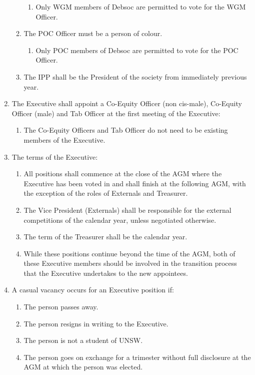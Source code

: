 \begin{enumerate}
\begin{enumerate}
    \begin{enumerate}
    \item Only WGM members of Debsoc are permitted to vote for the WGM Officer.
    \end{enumerate}
  \item The POC Officer must be a person of colour.
    \begin{enumerate}
    \item Only POC members of Debsoc are permitted to vote for the POC Officer.
    \end{enumerate}
  \item The IPP shall be the President of the society from immediately previous year. \label{ipp_desc}
  \end{enumerate}
\item The Executive shall appoint a Co-Equity Officer (non cis-male), Co-Equity Officer (male) and Tab Officer at the first meeting of the Executive:
  \begin{enumerate}
  \item The Co-Equity Officers and Tab Officer do not need to be existing members of the Executive.
  \end{enumerate}
\item The terms of the Executive:
  \begin{enumerate}
  \item All positions shall commence at the close of the AGM where the Executive has been voted in and shall finish at the following AGM, with the exception of the roles of Externals and Treasurer.
  \item The Vice President (Externals) shall be responsible for the external competitions of the calendar year, unless negotiated otherwise.
  \item The term of the Treasurer shall be the calendar year.
  \item While these positions continue beyond the time of the AGM, both of these Executive members should be involved in the transition process that the Executive undertakes to the new appointees.
  \end{enumerate}
\item A casual vacancy occurs for an Executive position if:
  \begin{enumerate}
  \item The person passes away.
  \item The person resigns in writing to the Executive.
  \item The person is not a student of UNSW.
  \item The person goes on exchange for a trimester without full disclosure at the AGM at which the person was elected.

\end{enumerate}
\end{enumerate}
